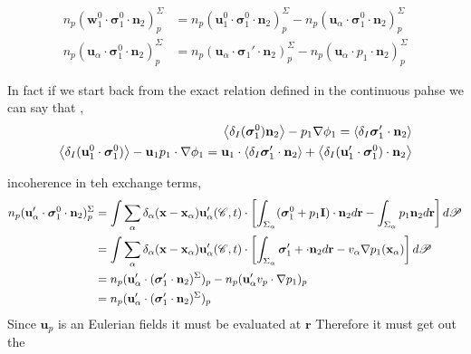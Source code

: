 \begin{align*}
    n_p (\textbf{w}_1^0 \cdot \bm{\sigma}_1^0 \cdot  \textbf{n}_2)^\Sigma_p
    &= 
    n_p (\textbf{u}_1^0 \cdot \bm{\sigma}_1^0 \cdot  \textbf{n}_2)^\Sigma_p
    - n_p (\textbf{u}_\alpha \cdot \bm{\sigma}_1^0 \cdot  \textbf{n}_2)^\Sigma_p\\
    n_p (\textbf{u}_\alpha \cdot \bm{\sigma}_1^0 \cdot  \textbf{n}_2)^\Sigma_p
    &=
    n_p (\textbf{u}_\alpha \cdot \bm{\sigma}_1' \cdot  \textbf{n}_2)^\Sigma_p
    - n_p (\textbf{u}_\alpha \cdot p_1 \cdot  \textbf{n}_2)^\Sigma_p
\end{align*}

In fact if we start back from the exact relation defined in the continuous pahse we can say that ,
\begin{align*}
    \left<\delta_I (\bm{\sigma}_1^0 ) \textbf{n}_2\right> - p_1 \mathbf{\nabla} \phi_1
    = 
    \left<\delta_I \bm{\sigma}_1'\cdot \textbf{n}_2\right>
    \\
    \left<\delta_I (\textbf{u}_1^0 \cdot\bm{\sigma}_1^0 )\right> - \textbf{u}_1p_1\cdot \mathbf{\nabla} \phi_1
    = \textbf{u}_1 \cdot \left<\delta_I \bm{\sigma}_1'\cdot \textbf{n}_2\right>
    + \left<\delta_I (\textbf{u}_1' \cdot \bm{\sigma}_1^0 )\cdot \textbf{n}_2\right>
\end{align*}

incoherence in teh exchange terms, 
\begin{align*}
    n_p (\textbf{u}_\alpha' \cdot \bm{\sigma}_1^0\cdot \textbf{n}_2)^\Sigma_p
    &= \int
    \sum_\alpha \delta_\alpha(\textbf{x} - \textbf{x}_\alpha)
    \textbf{u}_\alpha'(\mathscr{C},t)\cdot
    \left[\int_{\Sigma_\alpha} 
     (\bm{\sigma}_1^0 +p_1 \textbf{I})\cdot \textbf{n}_2
     d\textbf{r}
    - \int_{\Sigma_\alpha} 
     p_1  \textbf{n}_2
     d\textbf{r}\right]
     d\mathscr{P} \\
    &= \int
    \sum_\alpha \delta_\alpha(\textbf{x} - \textbf{x}_\alpha)
    \textbf{u}_\alpha'(\mathscr{C},t)\cdot
    \left[\int_{\Sigma_\alpha} 
     \bm{\sigma}_1' +\cdot \textbf{n}_2
     d\textbf{r}
    - v_\alpha \mathbf{\nabla} p_1(\textbf{x}_\alpha)
    \right]
     d\mathscr{P} \\
    &= n_p (\textbf{u}_\alpha' \cdot (\bm{\sigma}'_1\cdot \textbf{n}_2)^\Sigma )_p
    -  n_p (\textbf{u}_\alpha' v_p \cdot \mathbf{\nabla} p_1 )_p
     \\
    &= n_p (\textbf{u}_\alpha' \cdot (\bm{\sigma}'_1\cdot \textbf{n}_2)^\Sigma )_p
     \\
\end{align*}
Since $\textbf{u}_p$ is an Eulerian fields it must be evaluated at $\textbf{r}$ Therefore it must get out the 











